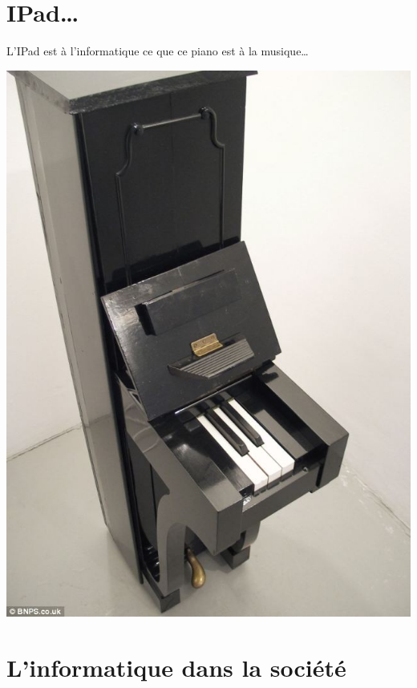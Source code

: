 \documentclass[french,handout]{beamer}
\begin{document}
\section{IPad\ldots{}}

\begin{frame}
L'IPad est à l'informatique ce que ce piano est à la musique\ldots{}
 \begin{center}
\includegraphics[height=.8\textheight]{./IpadPiano2touches.jpg}
\end{center}
\end{frame}





\section{L'informatique dans la société}
\end{document}
